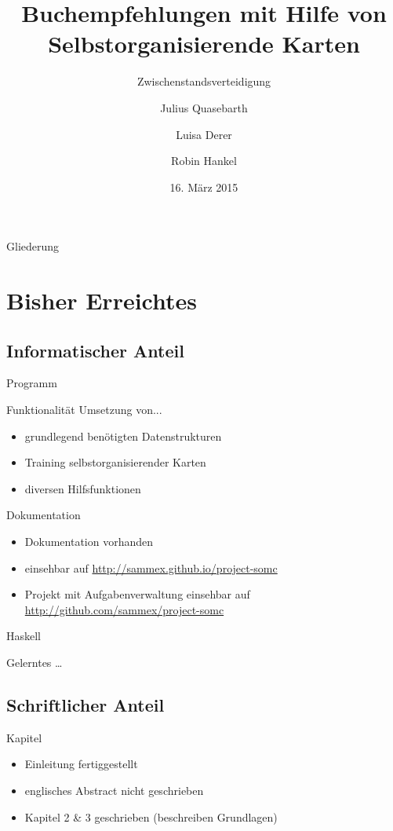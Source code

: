 \documentclass{beamer}
\title{Buchempfehlungen mit Hilfe von Selbstorganisierende Karten}
\subtitle{Zwischenstandsverteidigung}
\author{Julius Quasebarth \and Luisa Derer \and Robin Hankel}
\institute{Albert Schweitzer Gymnasium Erfurt, Spez.}
\date{16. März 2015}
\begin{document}
\maketitle

\begin{frame}{Gliederung}
\tableofcontents
\end{frame}

\section{Bisher Erreichtes}

\subsection{Informatischer Anteil}

\begin{frame}{Programm}
\begin{block}{Funktionalität}
Umsetzung von...
\pause
\begin{itemize}[<+->]
\item grundlegend benötigten Datenstrukturen
\item Training selbstorganisierender Karten
\item diversen Hilfsfunktionen
\end{itemize}
\end{block}
\pause
\begin{block}{Dokumentation}
\begin{itemize}[<+->]
\item Dokumentation vorhanden
\item einsehbar auf \url{http://sammex.github.io/project-somc}
\item Projekt mit Aufgabenverwaltung einsehbar auf \url{http://github.com/sammex/project-somc}
\end{itemize}
\end{block}
\end{frame}

\begin{frame}{Haskell}
\begin{block}{Gelerntes}
\dots
\end{block}
\end{frame}

\subsection{Schriftlicher Anteil}

\begin{frame}{Kapitel}
\begin{itemize}[<+->]
\item Einleitung fertiggestellt
\item englisches \glqq{}Abstract\grqq{} nicht geschrieben
\item Kapitel 2 \& 3 geschrieben (beschreiben Grundlagen)
\end{itemize}
\end{frame}
\end{document}
